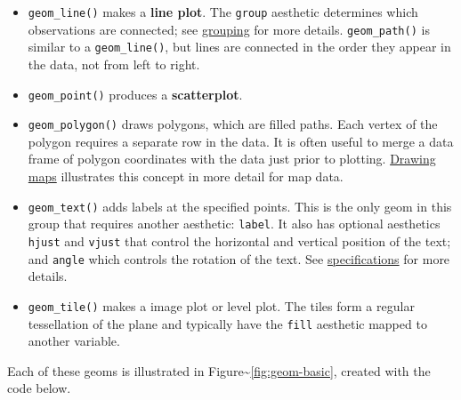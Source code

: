 \begin{itemize}
\itemsep1pt\parskip0pt
\item
  \texttt{geom\_line()} makes a \textbf{line plot}. The \texttt{group}
  aesthetic determines which observations are connected; see
  \hyperref[sub:grouping]{grouping} for more details.
  \texttt{geom\_path()} is similar to a \texttt{geom\_line()}, but lines
  are connected in the order they appear in the data, not from left to
  right.   
\item
  \texttt{geom\_point()} produces a \textbf{scatterplot}.
\item
  \texttt{geom\_polygon()} draws polygons, which are filled paths. Each
  vertex of the polygon requires a separate row in the data. It is often
  useful to merge a data frame of polygon coordinates with the data just
  prior to plotting. \hyperref[sec:maps]{Drawing maps} illustrates this
  concept in more detail for map data. 
\item
  \texttt{geom\_text()} adds labels at the specified points. This is the
  only geom in this group that requires another aesthetic:
  \texttt{label}. It also has optional aesthetics \texttt{hjust} and
  \texttt{vjust} that control the horizontal and vertical position of
  the text; and \texttt{angle} which controls the rotation of the text.
  See \hyperref[cha:specifications]{specifications} for more details.
   
\item
  \texttt{geom\_tile()} makes a image plot or level plot. The tiles form
  a regular tessellation of the plane and typically have the
  \texttt{fill} aesthetic mapped to another variable. 
   
\end{itemize}

\noindent Each of these geoms is illustrated in
Figure\textasciitilde{}\ref{fig:geom-basic}, created with the code
below.

